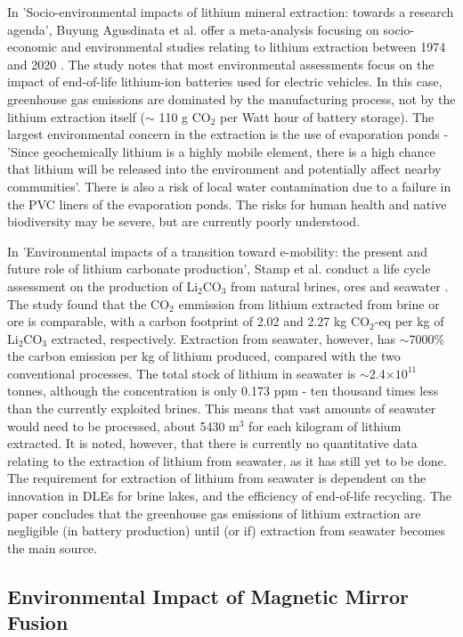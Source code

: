 In 'Socio-environmental impacts of lithium mineral extraction: towards a research agenda', Buyung Agusdinata et al. offer a meta-analysis focusing on socio-economic and environmental studies relating to lithium extraction between 1974 and 2020 \cite{agusdinata2018socio}. The study notes that most environmental assessments focus on the impact of end-of-life lithium-ion batteries used for electric vehicles. In this case, greenhouse gas emissions are dominated by the manufacturing process, not by the lithium extraction itself ($\sim$ 110 g CO$_2$ per Watt hour of battery storage). The largest environmental concern in the extraction is the use of evaporation ponds - 'Since geochemically lithium is a highly mobile element, there is a high chance that lithium will be released into the environment and potentially affect nearby communities'. There is also a risk of local water contamination due to a failure in the PVC liners of the evaporation ponds. The risks for human health and native biodiversity may be severe, but are currently poorly understood.

In 'Environmental impacts of a transition toward e-mobility: the present and future role of lithium carbonate production', Stamp et al. conduct a life cycle assessment on the production of Li$_2$CO$_3$ from natural brines, ores and seawater \cite{stamp2012environmental}. The study found that the CO$_2$ emmission from lithium extracted from brine or ore is comparable, with a carbon footprint of 2.02 and 2.27 kg CO$_2$-eq per kg of Li$_2$CO$_3$ extracted, respectively. Extraction from seawater, however, has $\sim$7000\% the carbon emission per kg of lithium produced, compared with the two conventional processes. The total stock of lithium in seawater is $\sim$2.4$\times 10^{11}$ tonnes, although the concentration is only 0.173 ppm - ten thousand times less than the currently exploited brines. This means that vast amounts of seawater would need to be processed, about 5430 m$^3$ for each kilogram of lithium extracted. It is noted, however, that there is currently no quantitative data relating to the extraction of lithium from seawater, as it has still yet to be done. The requirement for extraction of lithium from seawater is dependent on the innovation in DLEs for brine lakes, and the efficiency of end-of-life recycling. The paper concludes that the greenhouse gas emissions of lithium extraction are negligible (in battery production) until (or if) extraction from seawater becomes the main source.


\subsection{Environmental Impact of Magnetic Mirror Fusion}

